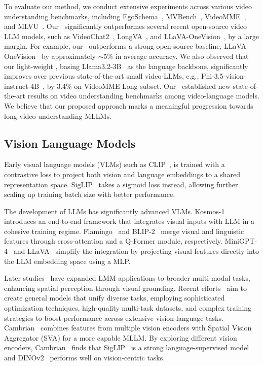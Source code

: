 To evaluate our method, we conduct extensive experiments across various video understanding benchmarks, including EgoSchema~\citep{mangalam2024egoschema}, MVBench~\citep{li2024mvbench}, VideoMME~\citep{fu2024video}, and MLVU~\citep{zhou2024mlvu}. Our \modelname~significantly outperformes several recent open-source video LLM models, such as VideoChat2~\citep{li2024mvbench}, LongVA~\citep{zhang2024long}, and LLaVA-OneVision~\citep{li2024llava}, by a large margin. For example, our \modelname~outperforms a strong open-source baseline, LLaVA-OneVision~\citep{li2024llava} by approximately $\sim$5\% in average accuracy. We also observed that our light-weight \modelname, basing Llama3.2-3B~\citep{llama32} as the language backbone, significantly improves over previous state-of-the-art small video-LLMs, e.g., Phi-3.5-vision-instruct-4B~\citep{abdin2024phi}, by 3.4\% on VideoMME Long subset. Our \modelname~established new state-of-the-art results on video understanding benchmarks among video-language models. We believe that our proposed approach marks a meaningful progression towards long video understanding MLLMs. 

\subsection{Vision Language Models} 

Early visual language models (VLMs) such as CLIP~\citep{radford2021learning}, is trained with a contrastive loss to project both vision and language embeddings to a shared representation space. SigLIP~\citep{zhai2023sigmoid} takes a sigmoid loss instead, allowing further scaling up training batch size with better performance.

The development of LLMs has significantly advanced VLMs. Kosmos-1~\citep{huang2023language,peng2023kosmos} introduces an end-to-end framework that integrates visual inputs with LLM in a cohesive training regime. Flamingo~\citep{alayrac2022flamingo} and BLIP-2~\citep{li2023blip} merge visual and linguistic features through cross-attention and a Q-Former module, respectively. MiniGPT-4~\citep{zhu2023minigpt} and LLaVA~\citep{liu2024visual} simplify the integration by projecting visual features directly into the LLM embedding space using a MLP.

Later studies~\citep{chen2023shikra,peng2023kosmos,wang2023cogvlm,chen2023minigpt} have expanded LMM applications to broader multi-modal tasks, enhancing spatial perception through visual grounding. Recent efforts~\citep{liu2024llavanext,dong2024internlm} aim to create general models that unify diverse tasks, employing sophisticated optimization techniques, high-quality multi-task datasets, and complex training strategies to boost performance across extensive vision-language tasks. Cambrian~\citep{tong2024cambrian} combines features from multiple vision encoders with Spatial Vision Aggregator (SVA) for a more capable MLLM. By exploring different vision encoders, Cambrian~\citep{tong2024cambrian} finds that  SigLIP~\citep{zhai2023sigmoid} is a strong language-supervised model and  DINOv2~\citep{oquab2023dinov2} performs well on  vision-centric tasks.

